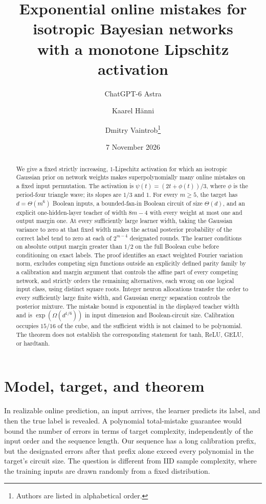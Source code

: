 \documentclass[11pt]{article}
\title{Exponential online mistakes for isotropic Bayesian networks\protect\\with a monotone Lipschitz activation}
\author{ChatGPT-6 Astra \and Kaarel H\"anni \and Dmitry Vaintrob\thanks{Authors are listed in alphabetical order.}}
\date{7 November 2026}
\begin{document}
\maketitle

\begin{abstract}
We give a fixed strictly increasing, $1$-Lipschitz activation for which
an isotropic Gaussian prior on network weights makes
superpolynomially many online mistakes on a fixed input permutation.
The activation is $\psi(t)=(2t+\phi(t))/3$, where $\phi$ is the
period-four triangle wave; its slopes are $1/3$ and $1$.
For every $m\ge5$,
the target has $d=\Theta(m^6)$ Boolean inputs, a bounded-fan-in Boolean
circuit of size $\Theta(d)$, and an explicit one-hidden-layer teacher
of width $8m-4$ with every weight at most one and output margin one.
At every sufficiently large learner width, taking the Gaussian variance
to zero at that fixed width makes the actual posterior probability of
the correct label tend to zero at each of $2^{m-4}$ designated rounds.
The learner conditions on absolute output margin greater than $1/2$
on the full Boolean cube before conditioning on exact labels.
The proof identifies an exact weighted Fourier variation norm,
excludes competing sign functions outside an explicitly defined parity
family by a calibration and margin argument that controls the affine
part of every competing network, and strictly orders the
remaining alternatives, each wrong on one logical input class, using
distinct square roots. Integer neuron allocations transfer the order to every
sufficiently large finite width, and Gaussian energy separation controls
the posterior mixture. The mistake bound is exponential in the displayed
teacher width and is $\exp(\Omega(d^{1/6}))$ in input dimension and
Boolean-circuit size. Calibration occupies $15/16$ of the cube, and the
sufficient width is not claimed to be polynomial. The theorem does not
establish the corresponding statement for tanh, ReLU, GELU, or hardtanh.
\end{abstract}

\section{Model, target, and theorem}

In realizable online prediction, an input arrives, the learner predicts
its label, and then the true label is revealed. A polynomial total-mistake
guarantee would bound the number of errors in terms of target complexity,
independently of the input order and the sequence length. Our sequence
has a long calibration prefix, but the designated errors after that
prefix alone exceed every polynomial in the target's circuit size.
The question is different from IID sample complexity, where the
training inputs are drawn randomly from a fixed distribution.
\end{document}
